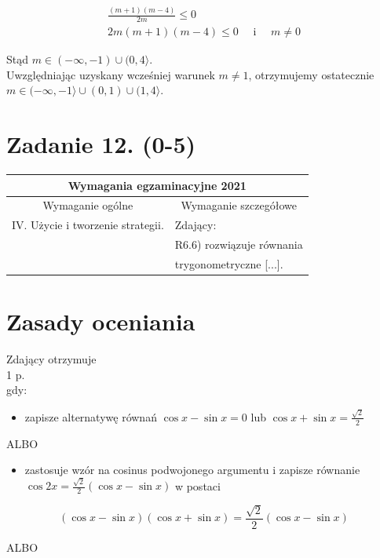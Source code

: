 \documentclass[10pt]{article}
\begin{document}
$$
\begin{gathered}
\frac{(m+1)(m-4)}{2 m} \leq 0 \\
2 m(m+1)(m-4) \leq 0 \quad \text { i } \quad m \neq 0
\end{gathered}
$$

Stąd $m \in(-\infty,-1) \cup(0,4\rangle$.\\
Uwzględniając uzyskany wcześniej warunek $m \neq 1$, otrzymujemy ostatecznie $m \in(-\infty,-1\rangle \cup(0,1) \cup(1,4\rangle$.

\section*{Zadanie 12. (0-5)}
\begin{center}
\begin{tabular}{|l|l|}
\hline
\multicolumn{2}{|c|}{Wymagania egzaminacyjne 2021} \\
\hline
\multicolumn{1}{|c|}{Wymaganie ogólne} & \multicolumn{1}{|c|}{Wymaganie szczegółowe} \\
\hline
IV. Użycie i tworzenie strategii. & Zdający: \\
 & R6.6) rozwiązuje równania \\
 & trygonometryczne [...]. \\
\hline
\end{tabular}
\end{center}

\section*{Zasady oceniania}
Zdający otrzymuje\\
1 p.\\
gdy:

\begin{itemize}
  \item zapisze alternatywę równań $\cos x-\sin x=0$ lub $\cos x+\sin x=\frac{\sqrt{2}}{2}$
\end{itemize}

ALBO

\begin{itemize}
  \item zastosuje wzór na cosinus podwojonego argumentu i zapisze równanie $\cos 2 x=\frac{\sqrt{2}}{2}(\cos x-\sin x)$ w postaci
\end{itemize}

$$
(\cos x-\sin x)(\cos x+\sin x)=\frac{\sqrt{2}}{2}(\cos x-\sin x)
$$

ALBO
\end{document}

